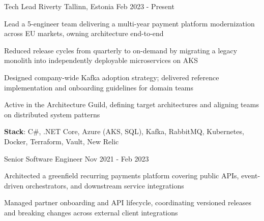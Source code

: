 

\begin{cventries}

  \cventry
    {Tech Lead} %
    {Riverty} %
    {Tallinn, Estonia} %
    {Feb 2023 - Present} %
    {
      \begin{cvitems} %
        \item {Lead a 5-engineer team delivering a multi-year payment platform modernization across EU markets, owning architecture end-to-end}
        \item {Reduced release cycles from quarterly to on-demand by migrating a legacy monolith into independently deployable microservices on AKS}
        \item {Designed company-wide Kafka adoption strategy; delivered reference implementation and onboarding guidelines for domain teams}
        \item {Active in the Architecture Guild, defining target architectures and aligning teams on distributed system patterns}
        \item {\textbf{Stack}: C\#, .NET Core, Azure (AKS, SQL), Kafka, RabbitMQ, Kubernetes, Docker, Terraform, Vault, New Relic}
      \end{cvitems}
    }

    \cventry
    {Senior Software Engineer} %
    {} %
    {} %
    {Nov 2021 - Feb 2023}
    {
      \begin{cvitems}
        \item {Architected a greenfield recurring payments platform covering public APIs, event-driven orchestrators, and downstream service integrations}
        \item {Managed partner onboarding and API lifecycle, coordinating versioned releases and breaking changes across external client integrations}
      \end{cvitems}
    }


\end{cventries}
